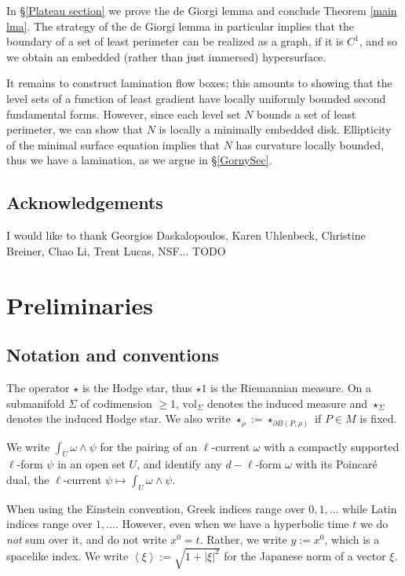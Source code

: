 \documentclass[reqno,11pt]{amsart}
\newcommand{\vol}{\mathrm{vol}}
\def\Japan#1{\left \langle #1 \right \rangle}
\theoremstyle{definition}
\numberwithin{equation}{section}
\begin{document}
In \S\ref{Plateau section} we prove the de Giorgi lemma and conclude Theorem \ref{main lma}.
The strategy of the de Giorgi lemma in particular implies that the boundary of a set of least perimeter can be realized as a graph, if it is $C^1$, and so we obtain an embedded (rather than just immersed) hypersurface.

It remains to construct lamination flow boxes; this amounts to showing that the level sets of a function of least gradient have locally uniformly bounded second fundamental forms.
However, since each level set $N$ bounds a set of least perimeter, we can show that $N$ is locally a minimally embedded disk.
Ellipticity of the minimal surface equation implies that $N$ has curvature locally bounded, thus we have a lamination, as we argue in \S\ref{GornySec}.


\subsection{Acknowledgements}
I would like to thank Georgios Daskalopoulos, Karen Uhlenbeck, Christine Breiner, Chao Li, Trent Lucas, NSF... TODO



\section{Preliminaries}\label{Prelims}
\subsection{Notation and conventions}
The operator $\star$ is the Hodge star, thus $\star 1$ is the Riemannian measure.
On a submanifold $\Sigma$ of codimension $\geq 1$, $\vol_\Sigma$ denotes the induced measure and $\star_\Sigma$ denotes the induced Hodge star. We also write $\star_\rho := \star_{\partial B(P, \rho)}$ if $P \in M$ is fixed.

We write $\int_U \omega \wedge \psi$ for the pairing of an $\ell$-current $\omega$ with a compactly supported $\ell$-form $\psi$ in an open set $U$, and identify any $d - \ell$-form $\omega$ with its Poincar\'e dual, the $\ell$-current $\psi \mapsto \int_U \omega \wedge \psi$.

When using the Einstein convention, Greek indices range over $0, 1, \dots$ while Latin indices range over $1, \dots$.
However, even when we have a hyperbolic time $t$ we do \emph{not} sum over it, and do not write $x^0 = t$.
Rather, we write $y := x^0$, which is a spacelike index.
We write $\Japan \xi := \sqrt{1 + |\xi|^2}$ for the Japanese norm of a vector $\xi$.
\end{document}
